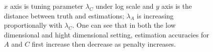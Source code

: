 \documentclass[fleqn,12pt]{article}
\begin{document}
\begin{figure}
\centering
{}
\caption{$x$ axis is tuning parameter $\lambda_C$ under log scale and $y$ axis is the distance between truth and estimations; $\lambda_A$ is increasing proportionally with $\lambda_C$. One can see that in both the low dimensional and hight dimensional setting, estimation accuracies for $A$ and $C$ first increase then decrease as penalty increases.}
\label{fig:low-high-d-sim}
\end{figure}
\end{document}
